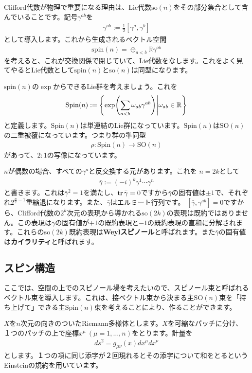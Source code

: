 \documentclass[paper=a4, fontsize=12pt, line_length=16cm, number_of_lines=33,dvipdfmx]{jlreq}
\numberwithin{equation}{section}
\newcommand{\Rb}{\mathbb{R}}
\newcommand{\strong}[1]{\textsf{\bfseries #1}}
\newcommand{\gammab}{\bar{\gamma}}
\newcommand{\so}{\mathrm{so}}
\newcommand{\spin}{\mathrm{spin}}
\newcommand{\SO}{\mathrm{SO}}
\newcommand{\Spin}{\mathrm{Spin}}
\begin{document}
Clifford代数が物理で重要になる理由は、Lie代数$\so(n)$をその部分集合として含んでいることです。記号$\gamma^{ab}$を
\begin{align}
  \gamma^{ab}:=\frac12 [\gamma^{a},\gamma^{b}]
\end{align}
として導入します。これから生成されるベクトル空間
\begin{align}
  \spin(n)=\oplus_{a<b}\Rb \gamma^{ab}
\end{align}
を考えると、これが交換関係で閉じていて、Lie代数をなします。これをよく見てやるとLie代数として$\spin(n)$と$\so(n)$は同型になります。

$\spin(n)$の$\exp$からできるLie群を考えましょう。これを
\begin{align}
  \Spin(n):=\qty{\exp(\sum_{a<b}\omega_{ab}\gamma^{ab})\Bigg| \omega_{ab}\in \Rb}
\end{align}
と定義します。$\Spin(n)$は単連結のLie群になっています。$\Spin(n)$は$\SO(n)$の二重被覆になっています。つまり群の準同型
\begin{align}
  \rho:\Spin(n)\to \SO(n)
\end{align}
があって、$2:1$の写像になっています。

$n$が偶数の場合、すべての$\gamma^a$と反交換する元があります。これを
$n=2k$として
\begin{align}
  \gammab:=(-i)^{k}\gamma^{1}\cdots \gamma^{n}
\end{align}
と書きます。これは$\gammab^2=1$を満たし、$\tr \gammab=0$ですから$\gammab$の固有値は$\pm 1$で、それぞれ$2^{\frac{n}{2}-1}$重縮退になります。また、$\gammab$はエルミート行列です。
$[\gammab,\gamma^{ab}]=0$ですから、Clifford代数の$2^k$次元の表現から導かれる$\so(2k)$の表現は既約ではありません。この表現は$\gammab$の固有値が$+1$の既約表現と$-1$の既約表現の直和に分解されます。これらの$\so(2k)$既約表現は\strong{Weylスピノール}と呼ばれます。また$\gammab$の固有値は\strong{カイラリティ}と呼ばれます。

\subsection{スピン構造}
ここでは、空間の上でのスピノール場を考えたいので、スピノール束と呼ばれるベクトル束を導入します。これは、接ベクトル束から決まる主$\SO(n)$束を「持ち上げて」できる主$\Spin(n)$束を考えることにより、作ることができます。

$X$を$n$次元の向きのついたRiemann多様体とします。$X$を可縮なパッチに分け、１つのパッチの上で座標$x^{\mu}\ (\mu=1,\dots,n)$をとります。計量を
\begin{align}
  ds^2=g_{\mu\nu}(x)dx^{\mu}dx^{\nu}
\end{align}
とします。１つの項に同じ添字が２回現れるとその添字について和をとるというEinsteinの規約を用いています。
\end{document}
